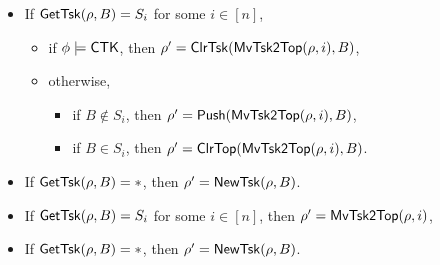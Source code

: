 \noindent {}
\begin{itemize}
	\item If $\mathsf{GetTsk}(\rho, B) = S_i$ for some $i\in[n]$,
	\begin{itemize}
		\item if $\phi \models{\sf CTK}$, then $\rho' = \mathsf{ClrTsk}(\mathsf{MvTsk2Top}(\rho, i), B)$,
		\item otherwise, 
		\begin{itemize}
			\item if $B \notin S_i$, then $\rho' = \mathsf{Push}(\mathsf{MvTsk2Top}(\rho, i), B)$,
			\item if $B \in S_i$, then $\rho' = \mathsf{ClrTop}(\mathsf{MvTsk2Top}(\rho, i), B)$.
		\end{itemize}
	\end{itemize}
	\item If $\mathsf{GetTsk}(\rho, B) = *$, then $\rho' = \mathsf{NewTsk}(\rho, B)$.
\end{itemize}
\noindent {}
\begin{itemize}
	\item If $\mathsf{GetTsk}(\rho, B) = S_i$ for some $i \in [n]$, then $\rho' = \mathsf{MvTsk2Top}(\rho, i)$,
	\item If $\mathsf{GetTsk}(\rho, B) = *$, then $\rho' = \mathsf{NewTsk}(\rho, B)$.
\end{itemize}


